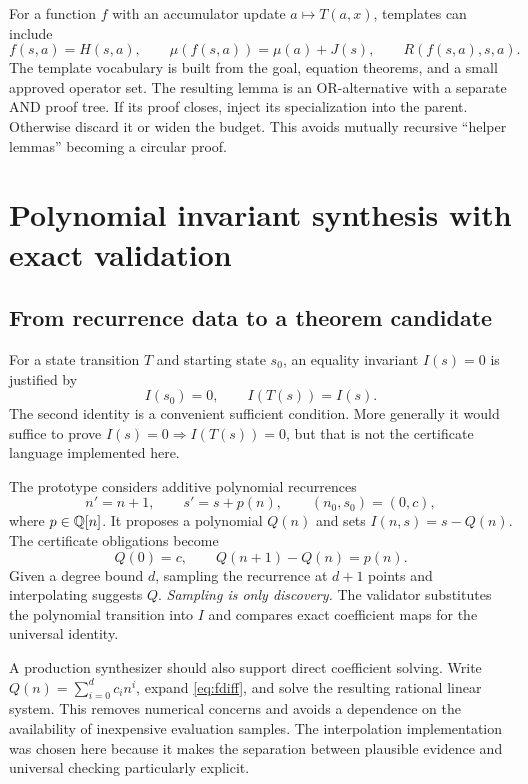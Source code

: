 For a function $f$ with an accumulator update $a\mapsto T(a,x)$, templates can
include
\[
 f(s,a)=H(s,a),\qquad
 \mu(f(s,a))=\mu(a)+J(s),\qquad
 R(f(s,a),s,a).
\]
The template vocabulary is built from the goal, equation theorems, and a small
approved operator set. The resulting lemma is an OR-alternative with a separate
AND proof tree. If its proof closes, inject its specialization into the parent.
Otherwise discard it or widen the budget. This avoids mutually recursive
``helper lemmas'' becoming a circular proof.

\section{Polynomial invariant synthesis with exact validation}

\subsection{From recurrence data to a theorem candidate}

For a state transition $T$ and starting state $s_0$, an equality invariant
$I(s)=0$ is justified by
\[
 I(s_0)=0,\qquad I(T(s))=I(s).
\]
The second identity is a convenient sufficient condition. More generally it
would suffice to prove $I(s)=0\Rightarrow I(T(s))=0$, but that is not the
certificate language implemented here.

The prototype considers additive polynomial recurrences
\begin{equation}\label{eq:additive}
 n'=n+1,\qquad s'=s+p(n),\qquad (n_0,s_0)=(0,c),
\end{equation}
where $p\in\mathbb{Q}[n]$. It proposes a polynomial $Q(n)$ and sets
$I(n,s)=s-Q(n)$. The certificate obligations become
\begin{equation}\label{eq:fdiff}
 Q(0)=c,\qquad Q(n+1)-Q(n)=p(n).
\end{equation}
Given a degree bound $d$, sampling the recurrence at $d+1$ points and
interpolating suggests $Q$. \emph{Sampling is only discovery.} The validator
substitutes the polynomial transition into $I$ and compares exact coefficient
maps for the universal identity.

A production synthesizer should also support direct coefficient solving.
Write $Q(n)=\sum_{i=0}^{d}c_i n^i$, expand \eqref{eq:fdiff}, and solve the
resulting rational linear system. This removes numerical concerns and avoids
a dependence on the availability of inexpensive evaluation samples. The
interpolation implementation was chosen here because it makes the separation
between plausible evidence and universal checking particularly explicit.

